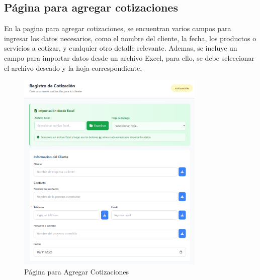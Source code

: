\documentclass{Pretexto/bluereport}
\begin{document}
\subsection{Página para agregar cotizaciones}

En la pagina para agregar cotizaciones, se encuentran varios campos para ingresar los datos necesarios, 
como el nombre del cliente, la fecha, los productos o servicios a cotizar, y cualquier otro detalle relevante.
Ademas, se incluye un campo para importar datos desde un archivo Excel, para ello, se debe seleccionar el archivo 
deseado y la hoja correspondiente.

\begin{figure}[H]
    \centering
    \includegraphics[width=0.8\textwidth]{img/agregar_cotizacion_pagina.png}
    \caption{Página para Agregar Cotizaciones}
    \label{fig:agregar_cotizacion_pagina}
\end{figure}
\end{document}
